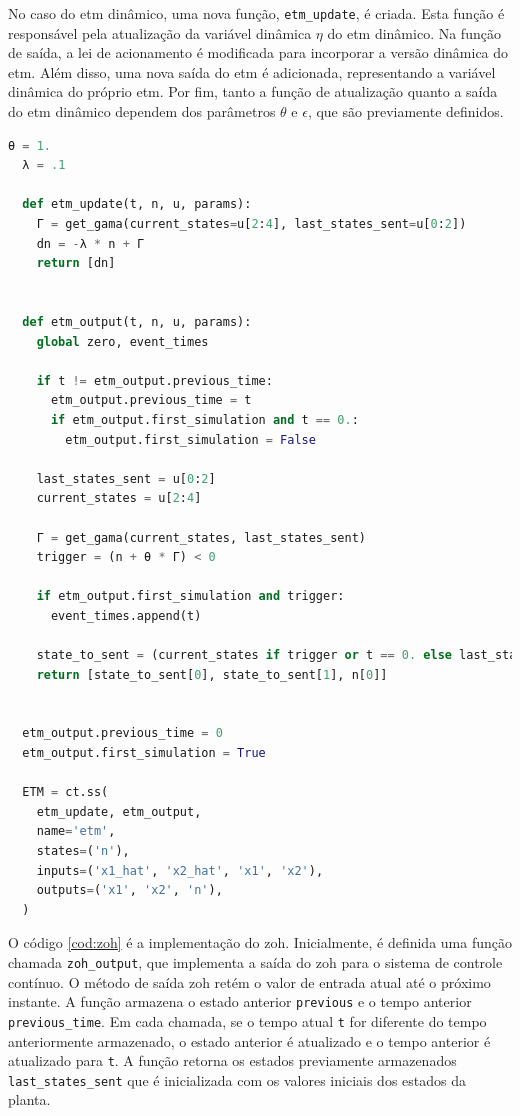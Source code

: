 No caso do \acrshort{etm} dinâmico, uma nova função, \texttt{etm\_update}, é criada. Esta função é responsável pela atualização da variável dinâmica $\eta$ do \acrshort{etm} dinâmico. Na função de saída, a lei de acionamento é modificada para incorporar a versão dinâmica do \acrshort{etm}. Além disso, uma nova saída do \acrshort{etm} é adicionada, representando a variável dinâmica do próprio \acrshort{etm}. Por fim, tanto a função de atualização quanto a saída do \acrshort{etm} dinâmico dependem dos parâmetros $\theta$ e $\epsilon$, que são previamente definidos.

\vspace{8pt}
\begin{lstlisting}[language=Python, caption={Implementação do \acrshort{etm} dinâmico.}, label=cod:dynamic_etm]
  θ = 1.
  λ = .1
  
  def etm_update(t, n, u, params):
    Γ = get_gama(current_states=u[2:4], last_states_sent=u[0:2])
    dn = -λ * n + Γ
    return [dn]


  def etm_output(t, n, u, params):
    global zero, event_times

    if t != etm_output.previous_time:
      etm_output.previous_time = t
      if etm_output.first_simulation and t == 0.:
        etm_output.first_simulation = False

    last_states_sent = u[0:2]
    current_states = u[2:4]

    Γ = get_gama(current_states, last_states_sent)
    trigger = (n + θ * Γ) < 0

    if etm_output.first_simulation and trigger:
      event_times.append(t)

    state_to_sent = (current_states if trigger or t == 0. else last_states_sent)
    return [state_to_sent[0], state_to_sent[1], n[0]]


  etm_output.previous_time = 0
  etm_output.first_simulation = True

  ETM = ct.ss(
    etm_update, etm_output,
    name='etm',
    states=('n'),
    inputs=('x1_hat', 'x2_hat', 'x1', 'x2'),
    outputs=('x1', 'x2', 'n'),
  )
  \end{lstlisting}

O código \ref{cod:zoh} é a implementação do \acrshort{zoh}. Inicialmente, é definida uma função chamada \texttt{zoh\_output}, que implementa a saída do \acrshort{zoh} para o sistema de controle contínuo. O método de saída \acrshort{zoh} retém o valor de entrada atual até o próximo instante. A função armazena o estado anterior \texttt{previous} e o tempo anterior \texttt{previous\_time}. Em cada chamada, se o tempo atual \texttt{t} for diferente do tempo anteriormente armazenado, o estado anterior é atualizado e o tempo anterior é atualizado para \texttt{t}. A função retorna os estados previamente armazenados \texttt{last\_states\_sent} que é inicializada com os valores iniciais dos estados da planta.

